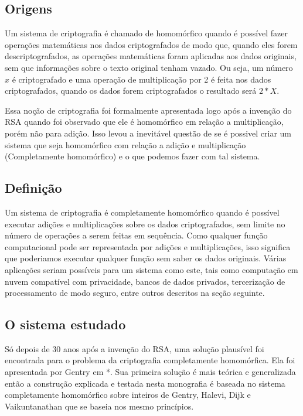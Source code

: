 	\subsection{Origens}
	Um sistema de criptografia é chamado de homomórfico quando é possível fazer operações matemáticas nos dados criptografados de modo que, quando eles forem descriptografados, as operações matemáticas foram aplicadas aos dados originais, sem que informações sobre o texto original tenham vazado.
Ou seja, um número \(x\) é criptografado e uma operação de multiplicação por 2 é feita nos dados criptografados, quando os dados forem criptografados o resultado será \(2*X\).

Essa noção de criptografia foi formalmente apresentada logo após a invenção do RSA quando foi observado que ele é homomórfico em relação a multiplicação, porém não para adição.
Isso levou a inevitável questão de se é possivel criar um sistema que seja homomórfico com relação a adição e multiplicação (Completamente homomórfico) e o que podemos fazer com tal sistema.

	\subsection{Definição}
	Um sistema de criptografia é completamente homomórfico quando é possível executar adições e multiplicações sobre os dados criptografados, sem limite no número de operações a serem feitas em sequência.
	Como qualquer função computacional pode ser representada por adições e multiplicações, isso significa que poderiamos executar qualquer função sem saber os dados originais. Várias aplicações seriam possíveis para um sistema como este, tais como computação em nuvem compatível com privacidade, bancos de dados privados, tercerização de processamento de modo seguro, entre outros descritos na seção seguinte.
	
	\subsection{O sistema estudado}
	Só depois de 30 anos após a invenção do RSA, uma solução plausível foi encontrada para o problema da criptografia completamente homomórfica. Ela foi apresentada por Gentry em *. Sua primeira solução é mais teórica e generalizada então a construção explicada e testada nesta monografia é baseada no sistema completamente homomórfico sobre inteiros de Gentry, Halevi, Dijk e Vaikuntanathan que se baseia nos mesmo princípios.

\newpage
  
